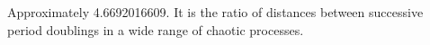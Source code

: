  Approximately 4.6692016609. It is the ratio of distances
between successive period doublings in a wide range of 
chaotic processes.
